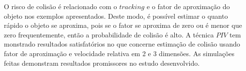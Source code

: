 
\begin{comment}
From the presented examples,
it can be observed that one application that uses the tracking
and the departure factor is related with the risk of collision.
It is possible to estimate how of fast an object is departing.
Thus, if the  departure factor tends to zero or 
if the velocity of departure factor changes to lower negatives values every time, 
probably, there is a high risk of collision. The $PIV$ technique has presented satisfactory results. 
It can be concluded that estimating collision using velocity of departure factor, 
tracking of objects in 2 or 3 dimensions, and departure distance
relative to the first position of $ROI$. 
The simulations in both cases has given promissory results.
\end{comment}

O risco de colisão é relacionado com o $tracking$ e o fator de aproximação do objeto nos 
exemplos apresentados. Deste modo, é possível estimar o quanto rápido o objeto se aproxima, pois
se o fator se aproxima de zero ou é menor que zero frequentemente, então a probabilidade de colisão é alto. 
A técnica $PIV$ tem monstrado resultados satisfatórios no que concerne estimação de colisão usando 
fator de aproximação e velocidade relativa em 2 e 3 dimensões. As simulações feitas demonstram 
resultados promissores no estudo desenvolvido.